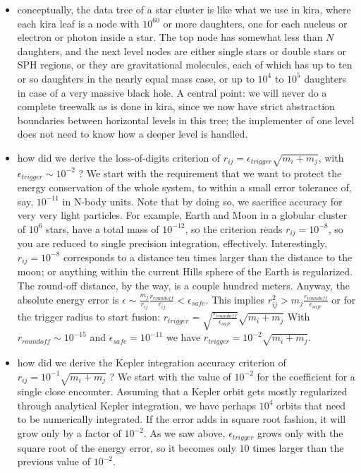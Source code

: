 \documentclass{article}[12pt]
\begin{document}
\begin{itemize}
\item conceptually, the data tree of a star cluster is like what
   we use in kira, where each kira leaf is a node with $10^{60}$
   or more daughters, one for each nucleus or electron or photon
   inside a star.  The top node has somewhat less than $N$
   daughters, and the next level nodes are either single stars
   or double stars or SPH regions, or they are gravitational
   molecules, each of which has up to ten or so daughters in
   the nearly equal mass case, or up to $10^4$ to $10^5$ daughters
   in case of a very massive black hole.  A central point: we will
   never do a complete treewalk as is done in kira, since we now
   have strict abstraction boundaries between horizontal levels
   in this tree; the implementer of one level does not need to
   know how a deeper level is handled.

\item how did we derive the loss-of-digits criterion of
   $r_{ij} = \epsilon_{trigger}\sqrt{m_i+m_j}$, with 
   $\epsilon_{trigger} \sim 10^{-2}$ ?
        We start with the requirement that we want to protect
   the energy conservation of the whole system, to within a small
   error tolerance of, say, $10^{-11}$ in N-body units.
        Note that by doing so, we sacrifice accuracy for
   very very light particles.  For example, Earth and Moon
   in a globular cluster of $10^6$ stars, have a total mass
   of $10^{-12}$, so the criterion reads $r_{ij} = 10^{-8}$,
   so you are reduced to single precision integration,
   effectively.  Interestingly, $r_{ij} = 10^{-8}$ corresponds
   to a distance ten times larger than the distance to the moon;
   or anything within the current Hills sphere of the Earth is
   regularized. The round-off distance, by the way, is a couple
   hundred meters.
        Anyway, the absolute energy error is $\epsilon \sim
   \frac{m_j}{r_{ij}}\frac{r_{roundoff}}{r_{ij}} < \epsilon_{safe}$.
   This implies $r_{ij}^2>m_j \frac{r_{roundoff}}{\epsilon_{safe}}$
   or for the trigger radius to start fusion: $r_{trigger} 
   = \sqrt{\frac{r_{roundoff}}{\epsilon_{safe}}}\sqrt{m_i+m_j}$
   With $r_{roundoff} \sim 10^{-15}$ and $\epsilon_{safe}=10^{-11}$
   we have $r_{trigger} = 10^{-2}\sqrt{m_i+m_j}$.

\item how did we derive the Kepler integration accuracy criterion of
   $r_{ij} = 10^{-1}\sqrt{m_i+m_j}$ ?  We start with the value
   of $10^{-2}$ for the coefficient for a single close encounter.
   Assuming that a Kepler orbit gets mostly regularized through
   analytical Kepler integration, we have perhaps $10^4$ orbits
   that need to be numerically integrated.  If the error adds
   in square root fashion, it will grow only by a factor of
   $10^{-2}$.  As we saw above, $\epsilon_{trigger}$ grows only
   with the square root of the energy error, so it becomes only
   $10$ times larger than the previous value of $10^{-2}$.


\end{itemize}
\end{document}
